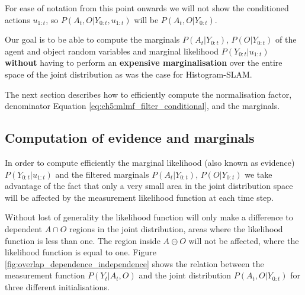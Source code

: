 

For ease of notation from this point onwards we will not show the conditioned actions $u_{1:t}$, so $P(A_t,O|Y_{0:t},u_{1:t})$ will 
be $P(A_t,O|Y_{0:t})$.

Our goal is to be able to compute the marginals $P(A_t|Y_{0:t})$, $P(O|Y_{0:t})$ of the agent and object random variables and 
marginal likelihood $P(Y_{0:t}|u_{1:t})$ \textbf{without} having to perform an \textbf{expensive marginalisation} over the entire space of the joint distribution 
as was the case for Histogram-SLAM. 

The next section describes how to efficiently compute the normalisation factor, denominator Equation \ref{eq:ch5:mlmf_filter_conditional}, and the marginals.


\subsection{Computation of evidence and marginals}

In order to compute efficiently the marginal likelihood (also known as evidence) $P(Y_{0:t}|u_{1:t})$ and the filtered  marginals $P(A_t|Y_{0:t})$,
$P(O|Y_{0:t})$ we take advantage of the fact that only a very small area 
in the joint distribution space will be affected by the measurement likelihood function at each time step.

Without lost of generality the likelihood function will only make a difference to dependent $A \cap O$ regions in the joint distribution, areas 
where the likelihood function is less than one. The region inside $A \ominus O$ will not be affected, where the likelihood function 
is equal to one.
Figure \ref{fig:overlap_dependence_independence} shows the relation between the measurement 
function $P(Y_t|A_t,O)$ and the joint distribution $P(A_t,O|Y_{0:t})$ for three different initialisations. 


